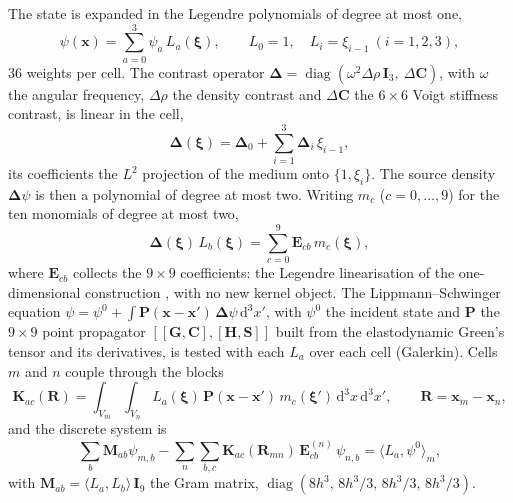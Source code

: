 \documentclass[11pt,a4paper]{article}
\newcommand{\bI}{\mathbf{I}}
\newcommand{\bK}{\mathbf{K}}
\newcommand{\bM}{\mathbf{M}}
\newcommand{\bE}{\mathbf{E}}
\newcommand{\bP}{\mathbf{P}}
\newcommand{\bD}{\boldsymbol{\Delta}}
\newcommand{\dd}{\mathrm{d}}
\begin{document}
The state is expanded in the Legendre polynomials of degree at most one,
\begin{equation}\label{eq:basis}
  \psi(\mathbf{x}) = \sum_{a=0}^{3}\psi_a\,L_a(\boldsymbol{\xi}),\qquad
  L_0=1,\quad L_i=\xi_{i-1}\ (i=1,2,3),
\end{equation}
36 weights per cell. The contrast operator
$\bD=\operatorname{diag}(\omega^2\Delta\rho\,\bI_3,\ \Delta\mathbf{C})$, with $\omega$ the angular
frequency, $\Delta\rho$ the density contrast and $\Delta\mathbf{C}$ the $6\times6$ Voigt stiffness
contrast, is linear in the cell,
\begin{equation}\label{eq:contrast}
  \bD(\boldsymbol{\xi}) = \bD_0+\sum_{i=1}^{3}\bD_i\,\xi_{i-1},
\end{equation}
its coefficients the $L^2$ projection of the medium onto $\{1,\xi_i\}$. The source density
$\bD\psi$ is then a polynomial of degree at most two. Writing $m_c$ ($c=0,\dots,9$) for the ten monomials
of degree at most two,
\begin{equation}\label{eq:linearisation}
  \bD(\boldsymbol{\xi})\,L_b(\boldsymbol{\xi})=\sum_{c=0}^{9}\bE_{cb}\,m_c(\boldsymbol{\xi}),
\end{equation}
where $\bE_{cb}$ collects the $9\times9$ coefficients: the Legendre linearisation of the one-dimensional
construction \citep{NestorError2026}, with no new kernel object. The Lippmann--Schwinger equation
$\psi=\psi^0+\int\bP(\mathbf{x}-\mathbf{x}')\,\bD\psi\,\dd^3x'$, with $\psi^0$ the incident state and
$\bP$ the $9\times9$ point propagator $[[\mathbf{G},\mathbf{C}],[\mathbf{H},\mathbf{S}]]$ built from the
elastodynamic Green's tensor and its derivatives, is tested with each $L_a$ over each cell (Galerkin).
Cells $m$ and $n$ couple through the blocks
\begin{equation}\label{eq:block}
  \bK_{ac}(\mathbf{R}) = \int_{V_m}\!\int_{V_n} L_a(\boldsymbol{\xi})\,
  \bP(\mathbf{x}-\mathbf{x}')\,m_c(\boldsymbol{\xi}')\,\dd^3x\,\dd^3x',\qquad \mathbf{R}=\mathbf{x}_m-\mathbf{x}_n,
\end{equation}
and the discrete system is
\begin{equation}\label{eq:system}
  \sum_b\bM_{ab}\psi_{m,b}-\sum_n\sum_{b,c}\bK_{ac}(\mathbf{R}_{mn})\,\bE^{(n)}_{cb}\,\psi_{n,b}
  =\langle L_a,\psi^0\rangle_m ,
\end{equation}
with $\bM_{ab}=\langle L_a,L_b\rangle\,\bI_9$ the Gram matrix,
$\operatorname{diag}(8h^3,\,8h^3/3,\,8h^3/3,\,8h^3/3)$.
\end{document}
